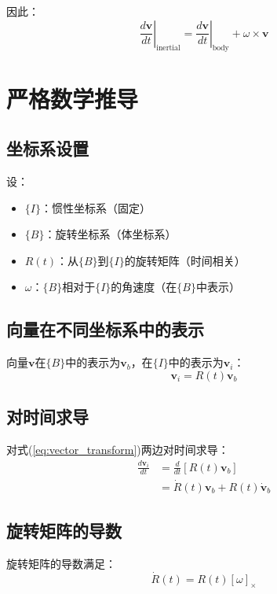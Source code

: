 \documentclass[12pt,a4paper]{article}
\begin{document}
因此：
\begin{equation}
\left.\frac{d\bm{v}}{dt}\right|_{\text{inertial}} = \left.\frac{d\bm{v}}{dt}\right|_{\text{body}} + \omega \times \bm{v}
\end{equation}

\section{严格数学推导}

\subsection{坐标系设置}

设：
\begin{itemize}
\item $\{I\}$：惯性坐标系（固定）
\item $\{B\}$：旋转坐标系（体坐标系）
\item $R(t)$：从$\{B\}$到$\{I\}$的旋转矩阵（时间相关）
\item $\omega$：$\{B\}$相对于$\{I\}$的角速度（在$\{B\}$中表示）
\end{itemize}

\subsection{向量在不同坐标系中的表示}

向量$\bm{v}$在$\{B\}$中的表示为$\bm{v}_b$，在$\{I\}$中的表示为$\bm{v}_i$：
\begin{equation}
\bm{v}_i = R(t) \bm{v}_b
\label{eq:vector_transform}
\end{equation}

\subsection{对时间求导}

对式(\ref{eq:vector_transform})两边对时间求导：
\begin{align}
\frac{d\bm{v}_i}{dt} &= \frac{d}{dt}[R(t) \bm{v}_b] \\
&= \dot{R}(t) \bm{v}_b + R(t) \dot{\bm{v}}_b
\label{eq:derivative_expanded}
\end{align}

\subsection{旋转矩阵的导数}

旋转矩阵的导数满足：
\begin{equation}
\dot{R}(t) = R(t) [\omega]_{\times}
\label{eq:rotation_derivative}
\end{equation}
\end{document}
